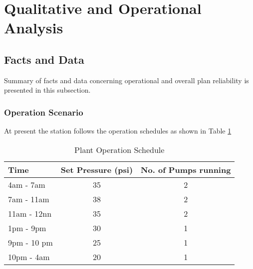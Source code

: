 %
\section{Qualitative and Operational Analysis}
\label{42}
\subsection{Facts and Data}

Summary of facts and data concerning operational and overall plan reliability is presented in this subsection.

\subsubsection{Operation Scenario}

At present the station follows the operation schedules as shown in Table \ref{operation_schedule}

\begin{table} [!htb]
    \begin{tabular}{l|c|c}
\hline
Time & Set Pressure (psi) & No. of Pumps running \\ 
\hline
4am - 7am & 35 & 2 \\ 
7am - 11am & 38 & 2 \\ 
11am - 12nn & 35 & 2 \\ 
1pm - 9pm & 30 & 1 \\ 
9pm - 10 pm & 25 & 1 \\ 
10pm - 4am & 20 & 1 \\ 
\hline
\end{tabular}
    \caption{Plant Operation Schedule}
    \label{operation_schedule}
\end{table}





%	


